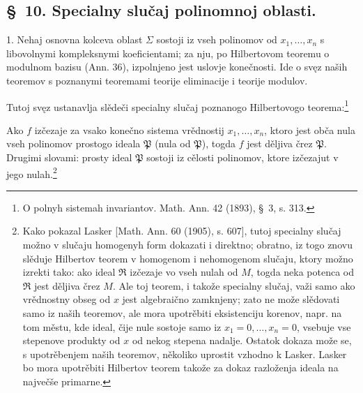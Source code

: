 \documentclass[11pt]{article}
\newcommand{\ideal}[1]{\mathfrak{#1}}
\begin{document}

\setcounter{footnote}{38}
\subsection*{\S~10. Specialny slučaj polinomnoj oblasti.}

1. Nehaj osnovna kolceva oblast \(\Sigma\) sostoji iz vseh polinomov od \(x_1,
\ldots,x_n\) s libovolnymi kompleksnymi koeficientami; za nju, po Hilbertovom teoremu o modulnom bazisu (Ann. 36), izpolnjeno jest uslovje konečnosti. Ide o svęz naših teoremov s poznanymi teoremami teorije eliminacije i teorije modulov.

Tutoj svęz ustanavlja slědeči specialny slučaj poznanogo Hilbertovogo teorema:\footnote{O polnyh sistemah invariantov. Math. Ann. 42 (1893), \S~3, s. 313.}

Ako \(f\) izčezaje za vsako konečno sistema vrědnostij \(x_1,
\ldots,x_n\), ktoro jest obča nula vseh polinomov prostogo ideala \(\ideal P\) (nula od \(\ideal P\)), togda \(f\) jest děljiva črez \(\ideal P\). Drugimi slovami: prosty ideal \(\ideal P\) sostoji iz cělosti polinomov, ktore izčezajut v jego nulah.\footnote{Kako pokazal Lasker [Math. Ann. 60 (1905), s. 607], tutoj specialny slučaj možno v slučaju homogenyh form dokazati i direktno; obratno, iz togo znovu slěduje Hilbertov teorem v homogenom i nehomogenom slučaju, ktory možno izrekti tako: ako ideal \(\ideal R\) izčezaje vo vseh nulah od \(M\), togda neka potenca od \(\ideal R\) jest děljiva črez \(M\). Ale toj teorem, i takože specialny slučaj, važi samo ako vrědnostny obseg od \(x\) jest algebraično zamknjeny; zato ne može slědovati samo iz naših teoremov, ale mora upotrěbiti eksistenciju korenov, napr. na tom městu, kde ideal, čije nule sostoje samo iz \(x_1=0,
\ldots,x_n=0\), vsebuje vse stepenove produkty od \(x\) od nekog stepena nadalje. Ostatok dokaza može se, s upotrěbenjem naših teoremov, několiko uprostit vzhodno k Lasker. Lasker bo mora upotrěbiti Hilbertov teorem takože za dokaz razloženja ideala na največše primarne.}
\end{document}
